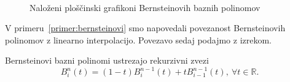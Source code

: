 \documentclass[isrm2, tisk]{fmfdelo}
\newcommand{\R}{\mathbb R}
\begin{document}
    \begin{figure}[h!]
        \captionsetup[subfigure]{labelformat=empty}
        \centering
        \qquad
         \\
        \qquad
        \caption{Naloženi ploščinski grafikoni Bernsteinovih baznih polinomov}
        \label{fig:bernstein-base-sum}
    \end{figure}
    V primeru~\ref{primer:bernsteinovi} smo napovedali povezanost Bernsteinovih polinomov z linearno interpolacijo.
    Povezavo sedaj podajmo z izrekom.
    \begin{izrek}\label{izrek:bernsteinovi_lastnosti:rekruzija}Bernsteinovi bazni polinomi ustrezajo rekurzivni zvezi
    \[B_i^n(t) = (1-t)B_i^{n-1}(t) + tB_{i-1}^{n-1}(t),\ \forall t\in\R.\]
    \end{izrek}
\end{document}

